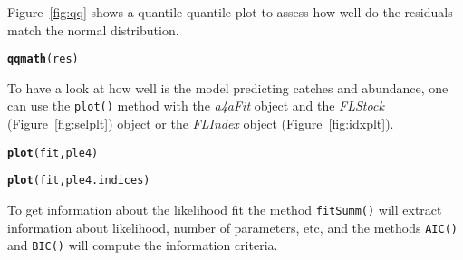 \documentclass[a4paper,english,10pt]{article}\usepackage[]{graphicx}\usepackage[]{color}
\makeatletter
\newcommand{\hlstd}[1]{\textcolor[rgb]{0.345,0.345,0.345}{#1}}%
\newcommand{\hlkwd}[1]{\textcolor[rgb]{0.737,0.353,0.396}{\textbf{#1}}}%
\newenvironment{kframe}{%
 \def\at@end@of@kframe{}%
 \ifinner\ifhmode%
  \def\at@end@of@kframe{\end{minipage}}%
  \begin{minipage}{\columnwidth}%
 \fi\fi%
 \def\FrameCommand##1{\hskip\@totalleftmargin \hskip-\fboxsep
 \colorbox{shadecolor}{##1}\hskip-\fboxsep
     \hskip-\linewidth \hskip-\@totalleftmargin \hskip\columnwidth}%
 \MakeFramed {\advance\hsize-\width
   \@totalleftmargin\z@ \linewidth\hsize
   \@setminipage}}%
 {\par\unskip\endMakeFramed%
 \at@end@of@kframe}
\newenvironment{knitrout}{}{} %
\newcommand{\code}[1]{{\texttt{#1}}}
\newcommand{\class}[1]{{\textit{#1}}}
\makeatother
\begin{document}
Figure~\ref{fig:qq} shows a quantile-quantile plot to assess how well do the residuals match the normal distribution.

\begin{knitrout}
\color{fgcolor}\begin{kframe}
\begin{alltt}
\hlkwd{qqmath}\hlstd{(res)}
\end{alltt}


{\ttfamily\noindent\bfseries{}}\end{kframe}
\end{knitrout}

To have a look at how well is the model predicting catches and abundance, one can use the \code{plot()} method with the \class{a4aFit} object and the \class{FLStock} (Figure~\ref{fig:selplt}) object or the \class{FLIndex} object (Figure~\ref{fig:idxplt}).

\begin{knitrout}
\color{fgcolor}\begin{kframe}
\begin{alltt}
\hlkwd{plot}\hlstd{(fit, ple4)}
\end{alltt}


{\ttfamily\noindent\bfseries\color{errorcolor}{\#\# Error: object 'fit' not found}}\end{kframe}
\end{knitrout}

\begin{knitrout}
\color{fgcolor}\begin{kframe}
\begin{alltt}
\hlkwd{plot}\hlstd{(fit, ple4.indices)}
\end{alltt}


{\ttfamily\noindent\bfseries\color{errorcolor}{\#\# Error: object 'fit' not found}}\end{kframe}
\end{knitrout}



To get information about the likelihood fit the method \code{fitSumm()} will extract information about likelihood, number of parameters, etc, and the methods \code{AIC()} and \code{BIC()} will compute the information criteria.
\end{document}
